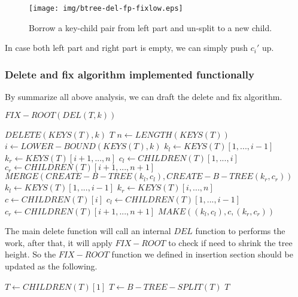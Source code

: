\documentclass{article}
\begin{document}
\begin{figure}[htbp]
    \begin{center}
      \texttt{[image: img/btree-del-fp-fixlow.eps]}
      \caption{Borrow a key-child pair from left part and
un-split to a new child.} \label{fig:del-fp-fixlow}
    \end{center}
\end{figure}

In case both left part and right part is empty, we can simply
push $c_i'$ up.

\subsubsection{Delete and fix algorithm implemented functionally}

By summarize all above analysis, we can draft the delete and fix
algorithm.

\begin{algorithmic}[1]
  \State \Return $FIX-ROOT(DEL(T, k))$
\EndFunction

    \State $DELETE(KEYS(T), k)$
    \State \Return $T$
  \Else {}
    \State $n \gets LENGTH(KEYS(T))$
    \State $i \gets LOWER-BOUND(KEYS(T), k)$
      \State $k_l \gets KEYS(T)[1, ..., i-1]$
      \State $k_r \gets KEYS(T)[i+1, ..., n]$
      \State $c_l \gets CHILDREN(T)[1, ..., i]$
      \State $c_r \gets CHILDREN(T)[i+1, ..., n+1]$
      \State \Return $MERGE(CREATE-B-TREE(k_l, c_l), CREATE-B-TREE(k_r, c_r))$
    \Else
      \State $k_l \gets KEYS(T)[1, ..., i-1]$
      \State $k_r \gets KEYS(T)[i, ..., n]$
      \State $c \gets CHILDREN(T)[i]$
      \State $c_l \gets CHILDREN(T)[1, ..., i-1]$
      \State $c_r \gets CHILDREN(T)[i+1, ..., n+1]$
      \State \Return $MAKE((k_l, c_l), c, (k_r, c_r))$
    \EndIf
  \EndIf
\EndFunction
\end{algorithmic}

The main delete function will call an internal $DEL$ function to
performs the work, after that, it will apply $FIX-ROOT$ to check
if need to shrink the tree height. So the $FIX-ROOT$ function we
defined in insertion section should be updated as the following.

\begin{algorithmic}[1]
   
    \State $T \gets CHILDREN(T)[1]$
    \State $T \gets B-TREE-SPLIT(T)$
  \EndIf
  \State \Return $T$
\EndFunction
\end{algorithmic}
\end{document}
